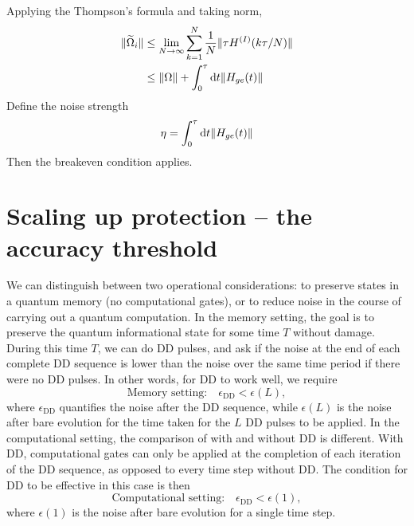 \documentclass[pra,reprint,superscriptaddress]{revtex4-2}
\newcommand{\wt}[1]{\widetilde{#1}}
\begin{document}
Applying the Thompson's formula and taking norm, 
\begin{equation}
\begin{split}
 \norm{\wt \Omega_i} &\le \lim_{N\to\infty}\sum_{k=1}^N \frac{1}{N} \norm{\tau H\up{I}(k \tau/N)}\\
 &\le \norm{\Omega} + \int_0^\tau \dd t \norm{H_{ge}(t)}
\end{split}
\end{equation}
Define the noise strength
\begin{equation}
\eta =  \int_0^\tau \mathop{}\!\mathrm{d} t \Vert {H_{ge}(t)} \Vert
\end{equation}
Then the breakeven condition applies.

\newpage
\section{Scaling up protection -- the accuracy threshold}\label{sec:threshold}
We can distinguish between two operational considerations: to preserve states in a quantum memory (no computational gates), or to reduce noise in the course of carrying out a quantum computation. In the memory setting, the goal is to preserve the quantum informational state for some time $T$ without damage. During this time $T$, we can do DD pulses, and ask if the noise at the end of each complete DD sequence is lower than the noise over the same time period if there were no DD pulses. In other words, for DD to work well, we require
\begin{equation}
\textrm{Memory setting:}\quad \epsilon_\mathrm{DD}<\epsilon(L),
\end{equation}
where $\epsilon_\mathrm{DD}$ quantifies the noise after the DD sequence, while $\epsilon(L)$ is the noise after bare evolution for the time taken for the $L$ DD pulses to be applied.
In the computational setting, the comparison of with and without DD is different. With DD, computational gates can only be applied at the completion of each iteration of the DD sequence, as opposed to every time step without DD. The condition for DD to be effective in this case is then
\begin{equation}\label{eq:cond}
\textrm{Computational setting:}\quad\epsilon_\mathrm{DD}<\epsilon(1),
\end{equation}
where $\epsilon(1)$ is the noise after bare evolution for a single time step. 
\end{document}
